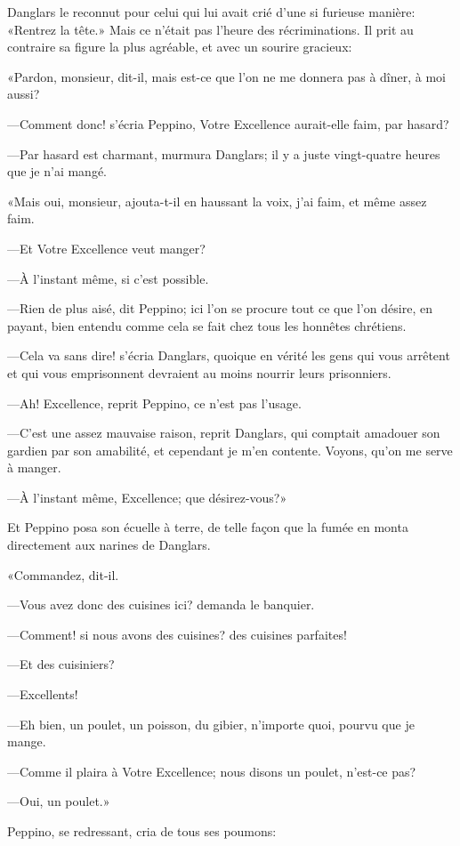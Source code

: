Danglars le reconnut pour celui qui lui avait crié d'une si furieuse manière: «Rentrez la tête.» Mais ce n'était pas l'heure des récriminations. Il prit au contraire sa figure la plus agréable, et avec un sourire gracieux: 

«Pardon, monsieur, dit-il, mais est-ce que l'on ne me donnera pas à dîner, à moi aussi? 

—Comment donc! s'écria Peppino, Votre Excellence aurait-elle faim, par hasard? 

—Par hasard est charmant, murmura Danglars; il y a juste vingt-quatre heures que je n'ai mangé. 

«Mais oui, monsieur, ajouta-t-il en haussant la voix, j'ai faim, et même assez faim. 

—Et Votre Excellence veut manger? 

—À l'instant même, si c'est possible. 

—Rien de plus aisé, dit Peppino; ici l'on se procure tout ce que l'on désire, en payant, bien entendu comme cela se fait chez tous les honnêtes chrétiens. 

—Cela va sans dire! s'écria Danglars, quoique en vérité les gens qui vous arrêtent et qui vous emprisonnent devraient au moins nourrir leurs prisonniers. 

—Ah! Excellence, reprit Peppino, ce n'est pas l'usage. 

—C'est une assez mauvaise raison, reprit Danglars, qui comptait amadouer son gardien par son amabilité, et cependant je m'en contente. Voyons, qu'on me serve à manger. 

—À l'instant même, Excellence; que désirez-vous?» 

Et Peppino posa son écuelle à terre, de telle façon que la fumée en monta directement aux narines de Danglars. 

«Commandez, dit-il. 

—Vous avez donc des cuisines ici? demanda le banquier. 

—Comment! si nous avons des cuisines? des cuisines parfaites! 

—Et des cuisiniers? 

—Excellents! 

—Eh bien, un poulet, un poisson, du gibier, n'importe quoi, pourvu que je mange. 

—Comme il plaira à Votre Excellence; nous disons un poulet, n'est-ce pas? 

—Oui, un poulet.» 

Peppino, se redressant, cria de tous ses poumons: 

